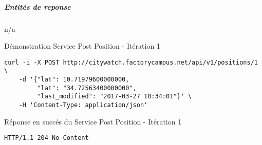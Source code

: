 \begin{appendices}
\subparagraph*{Entités de reponse}

n/a

\begin{listing}
    \caption{Démonstration Service Post Position - Itération 1}
\begin{verbatim}
curl -i -X POST http://citywatch.factorycampus.net/api/v1/positions/1 \
    -d '{"lat": 10.71979600000000,
         "lat": "34.72563400000000",
         "last_modified": "2017-03-27 10:34:01"}' \
    -H 'Content-Type: application/json'
\end{verbatim}
\end{listing}

\begin{listing}[ht]
    \caption{Réponse en succés du Service Post Position - Itération 1}
\begin{verbatim}
HTTP/1.1 204 No Content
\end{verbatim}
\end{listing}

\end{appendices}
